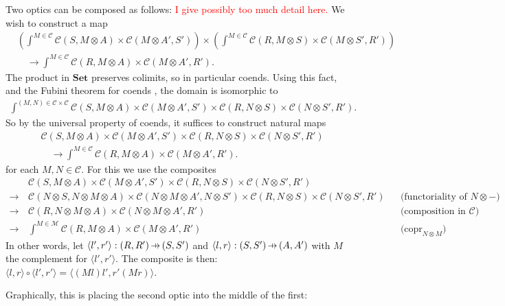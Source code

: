 \documentclass[11pt,a4paper]{article}
\theoremstyle{plain}
\theoremstyle{definition}
\newcommand{\C}{\mathscr{C}}
\newcommand{\M}{\mathscr{M}}
\newcommand{\Set}{\mathbf{Set}}
\DeclareMathOperator{\copr}{copr}
\newcommand{\hto}{\ensuremath{\,\mathaccent\shortmid\rightarrow\,}}
\newcommand{\todo}[1]{\textcolor{red}{\small #1}}
\begin{document}
Two optics can be composed as follows: \todo{I give possibly too much detail here.} We wish to construct a map
\begin{align*}
&\left(\int^{M \in \C} \C(S, M \otimes A) \times \C(M \otimes A', S')\right) \times \left(\int^{M \in \C} \C(R, M \otimes S) \times \C(M \otimes S', R')\right) \\ &
 \quad \to \int^{M \in \C} \C(R, M \otimes A) \times \C(M \otimes A', R').
\end{align*}
The product in $\Set$ preserves colimits, so in particular coends. Using this fact, and the Fubini theorem for coends \cite[Remark 1.9]{CoendCofriend}, the domain is isomorphic to
\begin{align*}
\int^{(M, N) \in \C \times \C} \C(S, M \otimes A) \times \C(M \otimes A', S') \times \C(R, N \otimes S) \times \C(N \otimes S', R').
\end{align*}
So by the universal property of coends, it suffices to construct natural maps 
\begin{align*}
& \C(S, M \otimes A) \times \C(M \otimes A', S') \times \C(R, N \otimes S) \times \C(N \otimes S', R') \\ &
 \quad \to \int^{M \in \C} \C(R, M \otimes A) \times \C(M \otimes A', R').
\end{align*}
for each $M, N \in \C$. For this we use the composites
\begin{align*}
&\C(S, M \otimes A) \times \C(M \otimes A', S') \times \C(R, N \otimes S) \times \C(N \otimes S', R')\\
\to \,& \C(N \otimes S, N \otimes M \otimes A) \times \C(N \otimes M \otimes A', N \otimes S') \times \C(R, N \otimes S) \times \C(N \otimes S', R') && \text{(functoriality of $N \otimes  -$)} \\
\to \,& \C(R, N \otimes  M \otimes A) \times \C(N \otimes M \otimes A', R') && \text{(composition in $\C$)} \\
\to \,&\int^{M \in \M} \C(R, M \otimes A) \times \C(M \otimes A', R') && \text{($\copr_{N \otimes M}$)}
\end{align*}
In other words, let $\langle l', r' \rangle : (R, R') \hto (S, S')$ and $\langle l, r \rangle : (S, S') \hto (A, A')$ with $M$ the complement for $\langle l', r' \rangle$. The composite is then: $\langle l, r \rangle \circ \langle l', r' \rangle = \langle (M l)l', r'(Mr)\rangle$. 

Graphically, this is placing the second optic into the middle of the first:
\begin{center}

\qquad\raisebox{1.5cm}{$\circ$}\qquad
 \\
\raisebox{1.5cm}{$:=$}\qquad

\end{center}
\end{document}
